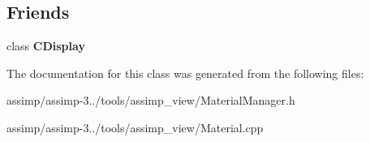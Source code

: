 \subsection*{Friends}
\begin{DoxyCompactItemize}
\item 
\hypertarget{class_c_material_manager_aa3085c13d7c5a500fb692244985d1896}{class {\bfseries C\+Display}}\label{class_c_material_manager_aa3085c13d7c5a500fb692244985d1896}

\end{DoxyCompactItemize}


The documentation for this class was generated from the following files\+:\begin{DoxyCompactItemize}
\item 
assimp/assimp-\/3../tools/assimp\+\_\+view/Material\+Manager.\+h\item 
assimp/assimp-\/3../tools/assimp\+\_\+view/Material.\+cpp\end{DoxyCompactItemize}
